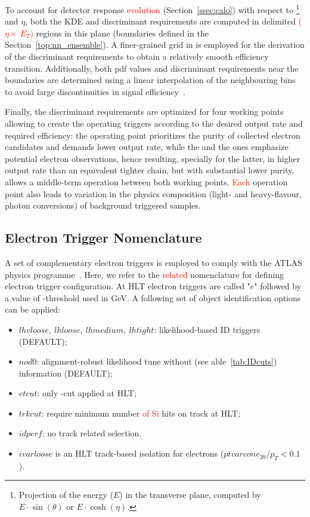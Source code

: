 To account for detector response \textcolor{red}{evolution} (Section~\ref{ssec:calo}) with
respect to \Et\footnote{Projection of the energy ($E$) in the transverse plane,
computed by $E\cdot\sin(\theta)$ or $E\cdot\cosh(\eta)$.} and
$\eta$, both the KDE and discriminant requirements are computed in delimited \textcolor{red}{($\eta\times~E_{T})$}
regions in this plane (boundaries defined in the Section~\ref{top:nn_ensemble}).
A finer-grained grid in \Et is employed for the derivation of the discriminant
requirements to obtain a relatively smooth efficiency transition. Additionally,
both pdf values and discriminant requirements near the boundaries are determined
using a linear interpolation of the neighbouring bins to avoid large
discontinuities in signal efficiency~\cite{aaboud2019electron}.

Finally, the discriminant requirements are optimized for four working points
allowing to create the operating triggers according to the desired output rate
and required efficiency: the \tight{} operating point prioritizes the purity of
collected electron candidates and demands lower output rate, while the \loose{}
and the \vloose{} ones emphasize potential electron observations, hence
resulting, specially for the latter, in higher output rate than an equivalent
tighter chain, but with substantial lower purity.  \medium{} allows a middle-term
operation between both working points. \textcolor{red}{Each} operation point also leads to
variation in the physics composition (light- and heavy-flavour, photon
conversions) of background triggered samples. 



\subsection{Electron Trigger Nomenclature}%
\label{ssec:menu}

A set of complementary electron triggers is employed to comply with the ATLAS
physics programme~\cite{aad2020performance}. Here, we refer to the \textcolor{red}{related} nomenclature for
defining electron trigger configuration.  At HLT electron triggers are called
"$e$" followed by a value of \et-threshold used in GeV. A following set of
object identification options can be applied:



\begin{itemize}
\item $lhvloose,~lhloose,~lhmedium,~lhtight$: likelihood-based ID triggers (DEFAULT);
\item $nod0$: alignment-robust likelihood tune without \trackdO (see able~\ref{tab:IDcuts}) information (DEFAULT);
\item $etcut$: only \et-cut applied at HLT;
\item $trkcut$: require minimum number \textcolor{red}{of Si} hits on track at HLT;
\item $idperf$: no track related selection.
\item $ivarloose$ is an HLT track-based isolation for electrons ($ptvarcone_{20}/p_T<0.1$).
\end{itemize}




